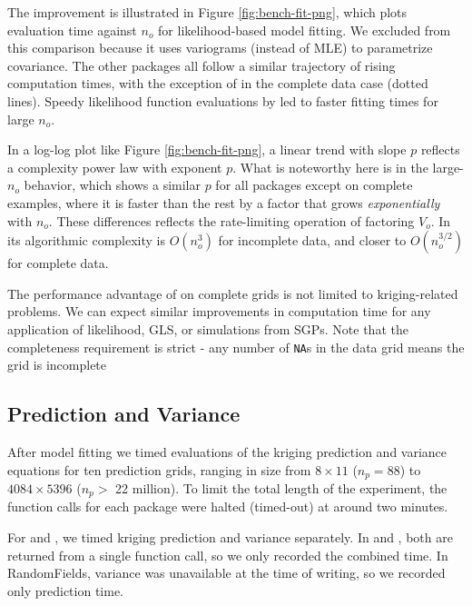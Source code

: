 The improvement is illustrated in Figure \ref{fig:bench-fit-png}, which plots evaluation time against \(n_o\) for likelihood-based model fitting. We excluded  from this comparison because it uses variograms (instead of MLE) to parametrize covariance. The other packages all follow a similar trajectory of rising computation times, with the exception of  in the complete data case (dotted lines). Speedy likelihood function evaluations by  led to faster fitting times for large \(n_o\).

In a log-log plot like Figure \ref{fig:bench-fit-png}, a linear trend with slope \(p\) reflects a complexity power law with exponent \(p\). What is noteworthy here is in the large-\(n_o\) behavior, which shows a similar \(p\) for all packages except  on complete examples, where it is faster than the rest by a factor that grows \emph{exponentially} with \(n_o\). These differences reflects the rate-limiting operation of factoring \(V_o\). In  its algorithmic complexity is \(O( n_o^3 )\) for incomplete data, and closer to \(O(n_o^{3/2})\) for complete data.

The performance advantage of  on complete grids is not limited to kriging-related problems. We can expect similar improvements in computation time for any application of likelihood, GLS, or simulations from SGPs. Note that the completeness requirement is strict - any number of \texttt{NA}s in the data grid means the grid is incomplete

\hypertarget{prediction-and-variance}{%
\subsection{Prediction and Variance}\label{prediction-and-variance}}

After model fitting we timed evaluations of the kriging prediction and variance equations for ten prediction grids, ranging in size from \(8 \times 11\) (\(n_p=88\)) to \(4084 \times 5396\) (\(n_p>\) 22 million). To limit the total length of the experiment, the function calls for each package were halted (timed-out) at around two minutes.

For  and , we timed kriging prediction and variance separately. In  and , both are returned from a single function call, so we only recorded the combined time. In RandomFields, variance was unavailable at the time of writing, so we recorded only prediction time.

